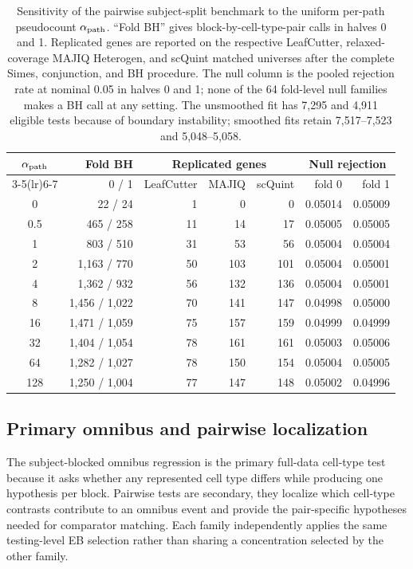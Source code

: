 \documentclass[11pt]{article}
\begin{document}
\begin{table}[H]
\centering
\scriptsize
\caption{Sensitivity of the pairwise subject-split benchmark to the uniform per-path pseudocount \(\alpha_{\rm path}\). ``Fold BH'' gives block-by-cell-type-pair calls in halves 0 and 1. Replicated genes are reported on the respective LeafCutter, relaxed-coverage MAJIQ Heterogen, and scQuint matched universes after the complete Simes, conjunction, and BH procedure. The null column is the pooled rejection rate at nominal 0.05 in halves 0 and 1; none of the 64 fold-level null families makes a BH call at any setting. The unsmoothed fit has 7,295 and 4,911 eligible tests because of boundary instability; smoothed fits retain 7,517--7,523 and 5,048--5,058.}
\label{tab:path-alpha-sensitivity}
\begin{tabular}{crrrrrr}
\toprule
\(\alpha_{\rm path}\) & Fold BH & \multicolumn{3}{c}{Replicated genes} & \multicolumn{2}{c}{Null rejection}\\
\cmidrule(lr){3-5}\cmidrule(lr){6-7}
& 0 / 1 & LeafCutter & MAJIQ & scQuint & fold 0 & fold 1\\
\midrule
0 & 22 / 24 & 1 & 0 & 0 & 0.05014 & 0.05009\\
0.5 & 465 / 258 & 11 & 14 & 17 & 0.05005 & 0.05005\\
1 & 803 / 510 & 31 & 53 & 56 & 0.05004 & 0.05004\\
2 & 1,163 / 770 & 50 & 103 & 101 & 0.05004 & 0.05001\\
4 & 1,362 / 932 & 56 & 132 & 136 & 0.05004 & 0.05001\\
8 & 1,456 / 1,022 & 70 & 141 & 147 & 0.04998 & 0.05000\\
16 & 1,471 / 1,059 & 75 & 157 & 159 & 0.04999 & 0.04999\\
32 & 1,404 / 1,054 & 78 & 161 & 161 & 0.05003 & 0.05006\\
64 & 1,282 / 1,027 & 78 & 150 & 154 & 0.05004 & 0.05005\\
128 & 1,250 / 1,004 & 77 & 147 & 148 & 0.05002 & 0.04996\\
\bottomrule
\end{tabular}
\end{table}

\subsection*{Primary omnibus and pairwise localization}

The subject-blocked omnibus regression is the primary full-data cell-type test because it asks whether any represented cell type differs while producing one hypothesis per block. Pairwise tests are secondary, they localize which cell-type contrasts contribute to an omnibus event and provide the pair-specific hypotheses needed for comparator matching. Each family independently applies the same testing-level EB selection rather than sharing a concentration selected by the other family.
\end{document}
